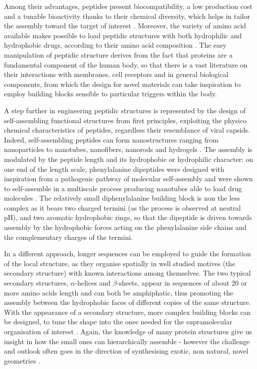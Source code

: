 Among their advantages, peptides present biocompatibility, a low production cost and a tunable bioactivity thanks to their chemical diversity, which helps in tailor the assembly toward the target of interest \cite{Fan2017}. Moreover, the variety of amino acid available makes possible to load peptidic structures with both hydrophilic and hydrophobic drugs, according to their amino acid composition \cite{Habibi2016,Ma2012}.
%
The easy manipulation of peptidic structure derives from the fact that proteins are a fundamental component of the human body, so that there is a vast literature on their interactions with membranes, cell receptors and in general biological components, from which the design for novel materials can take inspiration to employ building blocks sensible to particular triggers within the body.

A step further in engineering peptidic structures is represented by the design of self-assembling functional structures from first principles, exploiting the physico chemical characteristics of peptides, regardless their resemblance of viral capsids.
%
Indeed, self-assembling peptides can form nanostructures ranging from nanoparticles to nanotubes, nanofibers, nanorods and hydrogels \cite{Fan2017,Habibi2016}. The assembly is modulated by the peptide length and its hydrophobic or hydrophilic character: on one end of the length scale, phenylalanine dipeptides were designed with inspiration from a pathogenic pathway of molecular self-assembly \cite{Yan2010} and were shown to self-assemble in a multiscale process producing nanotubes able to load drug molecules \cite{Silva2013}. The relatively small diphenylalanine building block is non the less complex as it bears two charged termini (as the process is observed at neutral pH), and two aromatic hydrophobic rings, so that the dipeptide is driven towards assembly by the hydrophobic forces acting on the phenylalanine side chains and the complementary charges of the termini.

In a different approach, longer sequences can be employed to guide the formation of the local structure, as they organise spatially in well studied motives (the secondary structure) with known interactions among themselves.
%
The two typical secondary structures, $\alpha$-helices and $\beta$-sheets, appear in sequences of about 20 or more amino acids length and can both be amphiphatic, thus promoting the assembly between the hydrophobic faces of different copies of the same structure. With the appearance of a secondary structure, more complex building blocks can be designed, to tune the shape into the ones needed for the supramolecular organisation of interest \cite{King2014}. Again, the knowledge of many protein structures\cite{PDB} give us insight in how the small ones can hierarchically assemble - however the challenge and outlook often goes in the direction of synthesising exotic, non natural, novel geometries \cite{Yeates2019,Malay2019}.


